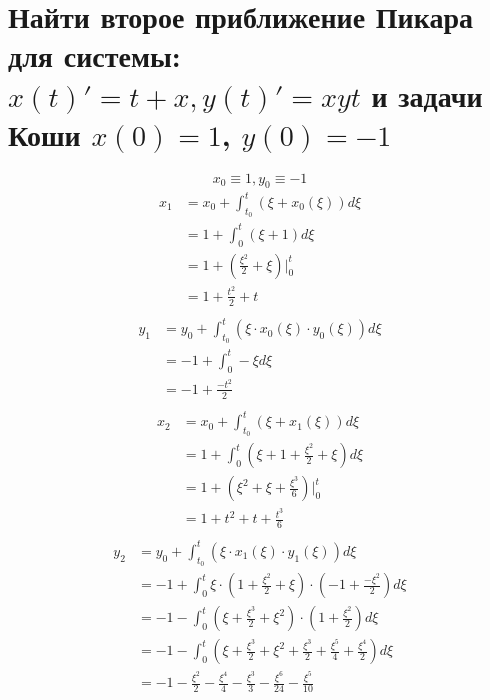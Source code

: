 

\cfoot{}



\section{Найти второе приближение Пикара для системы: $x(t)' = t+x, y(t)' = xyt$ и задачи Коши $x(0)=1$, $y(0)=-1$}

\[x_0 \equiv 1, y_0 \equiv -1\]
\begin{align*}
    x_1 & = x_0 + \int_{t_0}^t (\xi + x_0(\xi)) d\xi         \\
        & = 1 + \int_{0}^t (\xi + 1) d\xi                    \\
        & = 1 + \left(\frac{\xi^2}{2} + \xi\right)\Bigg|_0^t \\
        & = 1 + \frac{t^2}{2} + t                            \\
\end{align*}
\begin{align*}
    y_1 & = y_0 + \int_{t_0}^t (\xi \cdot x_0(\xi) \cdot y_0(\xi)) d\xi \\
        & = -1 + \int_0^t -\xi d\xi                                     \\
        & = -1 + \frac{-t^2}{2}                                         \\
\end{align*}
\begin{align*}
    x_2 & = x_0 + \int_{t_0}^t (\xi + x_1(\xi)) d\xi                         \\
        & = 1 + \int_{0}^t \left(\xi + 1 + \frac{\xi^2}{2} + \xi\right) d\xi \\
        & = 1 + \left(\xi^2 + \xi + \frac{\xi^3}{6}\right)\Bigg|_0^t         \\
        & = 1 + t^2 + t + \frac{t^3}{6}                                      \\
\end{align*}
\begin{align*}
    y_2 & = y_0 + \int_{t_0}^t (\xi \cdot x_1(\xi) \cdot y_1(\xi)) d\xi                                                         \\
        & = -1 + \int_0^t \xi \cdot \left(1 + \frac{\xi^2}{2} + \xi\right) \cdot \left(-1 + \frac{-\xi^2}{2}\right) d\xi        \\
        & = -1 - \int_0^t \left(\xi + \frac{\xi^3}{2} + \xi^2\right) \cdot \left(1 + \frac{\xi^2}{2}\right) d\xi                \\
        & = -1 - \int_0^t \left(\xi + \frac{\xi^3}{2} + \xi^2 + \frac{\xi^3}{2} + \frac{\xi^5}{4} + \frac{\xi^4}{2}\right) d\xi \\
        & = -1 - \frac{\xi^2}{2} - \frac{\xi^4}{4} - \frac{\xi^3}{3} - \frac{\xi^6}{24} - \frac{\xi^5}{10}                      \\
\end{align*}

